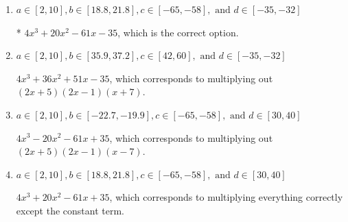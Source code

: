 \documentclass{extbook}[14pt]
\begin{document}
\begin{enumerate}
{\begin{enumerate}[label=\Alph*.]
$4x^{3} +40 x^{2} +89 x + 35$, which corresponds to multiplying out $(2x + 5)(2x + 1)(x + 7)$.
\item \( a \in [2, 10], b \in [18.8, 21.8], c \in [-65, -58], \text{ and } d \in [-35, -32] \)

* $4x^{3} +20 x^{2} -61 x -35$, which is the correct option.
\item \( a \in [2, 10], b \in [35.9, 37.2], c \in [42, 60], \text{ and } d \in [-35, -32] \)

$4x^{3} +36 x^{2} +51 x -35$, which corresponds to multiplying out $(2x + 5)(2x -1)(x + 7)$.
\item \( a \in [2, 10], b \in [-22.7, -19.9], c \in [-65, -58], \text{ and } d \in [30, 40] \)

$4x^{3} -20 x^{2} -61 x + 35$, which corresponds to multiplying out $(2x + 5)(2x -1)(x -7)$.
\item \( a \in [2, 10], b \in [18.8, 21.8], c \in [-65, -58], \text{ and } d \in [30, 40] \)

$4x^{3} +20 x^{2} -61 x + 35$, which corresponds to multiplying everything correctly except the constant term.
\end{enumerate}

}
\end{enumerate}
\end{document}
